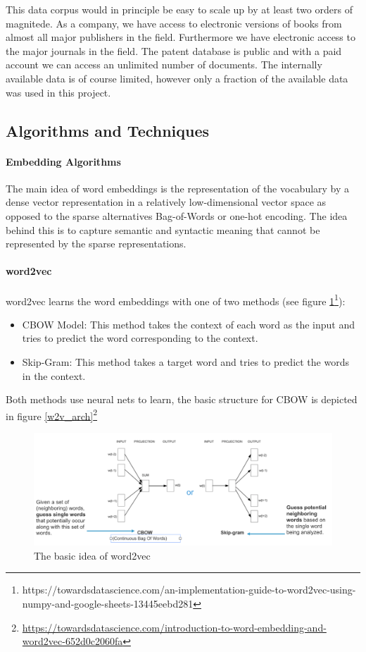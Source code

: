 \documentclass[10pt,a4paper]{article}
\begin{document}
	This data corpus would in principle be easy to scale up by at least two orders of magnitede. As a company, we have access to electronic versions of books from almost all major publishers in the field. Furthermore we have electronic access to the major journals in the field. The patent database is public and with a paid account we can access an unlimited number of documents. The internally available data is of course limited, however only a fraction of the available data was used in this project.      
	 
    \subsection{Algorithms and Techniques}
    \paragraph{Embedding Algorithms}
    The main idea of word embeddings is the representation of the vocabulary by a dense vector representation in a relatively low-dimensional vector space as opposed to the sparse alternatives Bag-of-Words or one-hot encoding. The idea behind this is to capture semantic and syntactic meaning that cannot be represented by the sparse representations.
    
    \paragraph{word2vec} word2vec learns the word embeddings with one of two methods (see figure \ref{w2v}\footnote{https://towardsdatascience.com/an-implementation-guide-to-word2vec-using-numpy-and-google-sheets-13445eebd281}):
    \begin{itemize}
    	\item CBOW Model: This method takes the context of each word as the input and tries to predict the word corresponding to the context. 
    	\item Skip-Gram: This method takes a target word and tries to predict the words in the context.
    \end{itemize}
    Both methods use neural nets to learn, the basic structure for CBOW is depicted in figure \ref{w2v_arch}\footnote{\url{https://towardsdatascience.com/introduction-to-word-embedding-and-word2vec-652d0c2060fa}}
    
\begin{figure}
    \begin{center}
    	\includegraphics[scale=0.25]{./Pictures/w2v_pic.png}
    	
    	\caption{The basic idea of word2vec}
    	\label{w2v}
    \end{center}
\end{figure}
\end{document}
